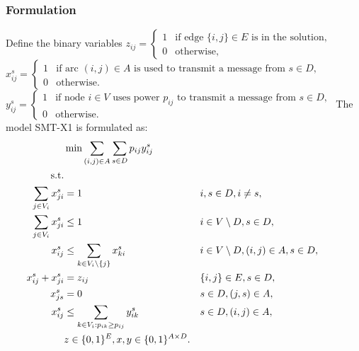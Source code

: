 \subsubsection{Formulation}
Define the binary variables
\newline\newline
  $z_{ij}=
	\begin{cases}
    1 & \text{if edge $\{i,j\} \in E$ is in the solution},\\
    0 & \text{otherwise},
  \end{cases}$
\newline\newline
  $x^{s}_{ij}=
	\begin{cases}
    1 & \text{if arc $(i,j) \in A$ is used to transmit a message from $s\in D$},\\
    0 & \text{otherwise}.
  \end{cases}$
  \newline\newline
  $y^s_{ij}=
	\begin{cases}
    1 & \text{if node $i \in V$ uses power $p_{ij}$ to transmit a message from $s\in D$},\\
    0 & \text{otherwise}.
  \end{cases}$
\newline
\newline    
The model SMT-X1 is formulated as:
\begin{subequations}\label{eq:smt-x1}
\begin{flalign}
\label{objective:dd} &\makebox[0pt][l]{$\displaystyle{}\min \sum\limits_{(i,j) \in A} \sum\limits_{s \in D} p_{ij} y^s_{ij} $}  & &&\\ \notag  
\text{s.t.}&  &  &                 && \\	\
\label{con:dd:arrowFromDest} \sum\limits_{j\in V_i}x^s_{ji} & = 1 && i,s\in D,i\neq s, && \\ 
\label{con:dd:arrowFromNonDestB} \sum\limits_{j\in V_{i}}x^s_{ji} & \leq 1 && i\in V \setminus D, s\in D,   &&\\	
\label{con:dd:arrowFromNonDestA} x^s_{ij}  & \leq \sum\limits_{k\in V_{i}\setminus \{j\}}x^s_{ki} && i\in V \setminus D,(i,j)\in A, s\in D,   &&\\	
\label{con:dd:oneDir} x^s_{ij} + x^s_{ji} & = z_{ij} && \{i,j\}\in E, s\in D, &&\\
\label{con:dd:startInSource}  x^s_{js}    & = 0   &&  s\in D, (j,s)\in A, &&\\		 
\label{con:dd:yvar} x^s_{ij} & \leq \sum\limits_{k\in V_i:p_{ik}\geq p_{ij}}y^s_{ik} && s\in D, (i,j)\in A, &&\\  
& \label{con:dd:vardim}	z \in \{0,1\}^{E}, x,y\in \{0,1\}^{A\times D}. &&	
\end{flalign}~
\end{subequations}  
